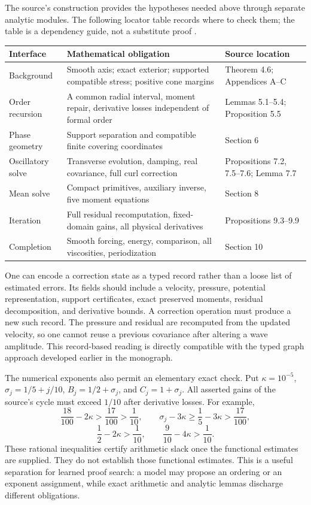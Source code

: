 The source's construction provides the hypotheses needed above through
separate analytic modules. The following locator table records where to
check them; the table is a dependency guide, not a substitute proof
\citep{NSOpenAI2026,NSLean2026}.

\begin{longtable}{p{}p{}p{}}
\toprule
Interface & Mathematical obligation & Source location\\
\midrule\endhead
Background & Smooth axis; exact exterior; supported compatible stress;
positive cone margins & Theorem 4.6; Appendices A--C\\
Order recursion & A common radial interval, moment repair, derivative losses
independent of formal order & Lemmas 5.1--5.4; Proposition 5.5\\
Phase geometry & Support separation and compatible finite covering coordinates
& Section 6\\
Oscillatory solve & Transverse evolution, damping, real covariance, full curl
correction & Propositions 7.2, 7.5--7.6; Lemma 7.7\\
Mean solve & Compact primitives, auxiliary inverse, five moment equations
& Section 8\\
Iteration & Full residual recomputation, fixed-domain gains, all physical
derivatives & Propositions 9.3--9.9\\
Completion & Smooth forcing, energy, comparison, all viscosities, periodization
& Section 10\\
\bottomrule
\end{longtable}

One can encode a correction state as a typed record rather than a loose
list of estimated errors. Its fields should include a velocity, pressure,
potential representation, support certificates, exact preserved moments,
residual decomposition, and derivative bounds. A correction operation
must produce a new such record. The pressure and residual are recomputed
from the updated velocity, so one cannot reuse a previous covariance after
altering a wave amplitude. This record-based reading is directly compatible
with the typed graph approach developed earlier in the monograph.

The numerical exponents also permit an elementary exact check. Put
$\kappa=10^{-5}$, $\sigma_j=1/5+j/10$,
$B_j=1/2+\sigma_j$, and $C_j=1+\sigma_j$.
All asserted gains of the source's cycle must exceed $1/10$ after
derivative losses. For example,
\[
 \frac{18}{100}-2\kappa>\frac{17}{100}>\frac1{10},\qquad
 \sigma_j-3\kappa\geq\frac15-3\kappa>\frac{17}{100},
\]
\[
 \frac12-2\kappa>\frac1{10},\qquad
 \frac9{10}-4\kappa>\frac1{10}.
\]
These rational inequalities certify arithmetic slack once the functional
estimates are supplied. They do not establish those functional estimates.
This is a useful separation for learned proof search: a model may propose
an ordering or an exponent assignment, while exact arithmetic and analytic
lemmas discharge different obligations.

